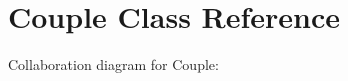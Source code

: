 \hypertarget{classCouple}{}\section{Couple Class Reference}
\label{classCouple}


Collaboration diagram for Couple\+:
